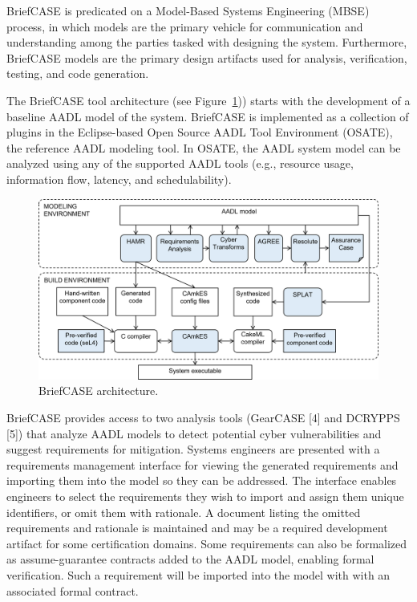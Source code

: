 
BriefCASE is predicated on a Model-Based Systems Engineering (MBSE) process, in which models are the primary vehicle for communication and understanding among the parties tasked with designing the system. Furthermore, BriefCASE models are the primary design artifacts used for analysis, verification, testing, and code generation.

The BriefCASE tool architecture (see Figure~\ref{fig:briefcase-architecture})) starts with the development of a baseline AADL model of the system. BriefCASE is implemented as a collection of plugins in the Eclipse-based Open Source AADL Tool Environment (OSATE), the reference AADL modeling tool. In OSATE, the AADL system model can be analyzed using any of the supported AADL tools (e.g., resource usage, information flow, latency, and schedulability). 

\begin{figure}[h] 
	\centering 
	\includegraphics[width=\textwidth]{figs/briefcase-architecture.png}
	\caption{BriefCASE architecture.}
	\label{fig:briefcase-architecture} 
\end{figure}


BriefCASE provides access to two analysis tools (GearCASE [4] and DCRYPPS [5]) that analyze AADL models to detect potential cyber vulnerabilities and suggest requirements for mitigation. 
Systems engineers are presented with a requirements management interface for viewing the generated requirements and importing them into the model so they can be addressed. 
The interface enables engineers to select the requirements they wish to import and assign them unique identifiers, or omit them with rationale. 
A document listing the omitted requirements and rationale is maintained and may be a required development artifact for some certification domains. 
Some requirements can also be formalized as assume-guarantee contracts added to the AADL model, enabling formal verification. Such a requirement will be imported into the model with with an associated formal contract.

